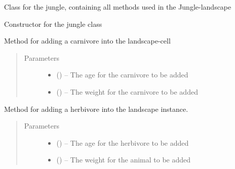 \documentclass[a4paper,10pt,english]{sphinxmanual}
\begin{document}
\begin{fulllineitems}
\label{\detokenize{landscape:biosim.landscape.Jungle}}
Class for the jungle, containing all methods used in the Jungle-landscape

Constructor for the jungle class

\begin{fulllineitems}
\label{\detokenize{landscape:biosim.landscape.Jungle.add_carnivore}}
Method for adding a carnivore into the landscape-cell
\begin{quote}\begin{description}
\item[{Parameters}] \leavevmode\begin{itemize}
\item {} 
 () -- The age for the carnivore to be added

\item {} 
 () -- The weight for the carnivore to be added

\end{itemize}

\end{description}\end{quote}

\end{fulllineitems}


\begin{fulllineitems}
\label{\detokenize{landscape:biosim.landscape.Jungle.add_herbivore}}
Method for adding a herbivore into the landscape instance.
\begin{quote}\begin{description}
\item[{Parameters}] \leavevmode\begin{itemize}
\item {} 
 () -- The age for the herbivore to be added

\item {} 
 () -- The weight for the animal to be added


\end{itemize}
\end{description}
\end{quote}
\end{fulllineitems}
\end{fulllineitems}
\end{document}

